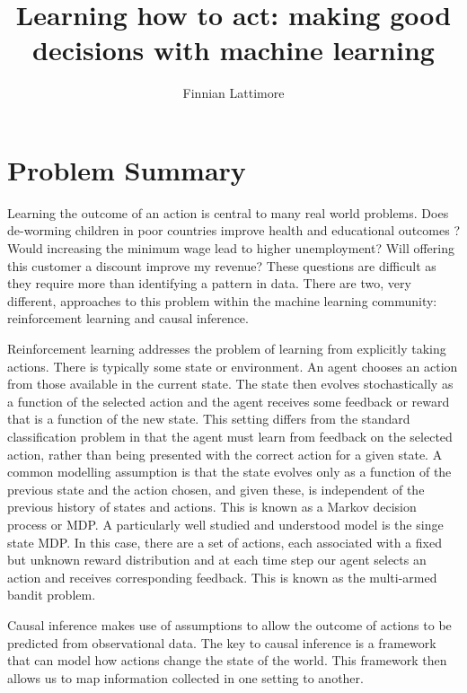 \documentclass[11pt,a4paper]{article}
\author{Finnian Lattimore}
\title{Learning how to act: making good decisions with machine learning}
\begin{document}
\def\ci{\perp\!\!\!\perp} %
\newtheorem{theorem}{Theorem}[section]
\newtheorem{definition}{Definition}[section]
\maketitle

\section{Problem Summary}

Learning the outcome of an action is central to many real world problems. Does de-worming children in poor countries improve health and educational outcomes \cite{miguel2004,davey2015}? Would increasing the minimum wage lead to higher unemployment? Will offering this customer a discount improve my revenue? These questions are difficult as they require more than identifying a pattern in data.  There are two, very different, approaches to this problem within the machine learning community: reinforcement learning and causal inference. 

Reinforcement learning addresses the problem of learning from explicitly taking actions. There is typically some state or environment. An agent chooses an action from those available in the current state. The state then evolves stochastically as a function of the selected action and the agent receives some feedback or reward that is a function of the new state. This setting differs from the standard classification problem in that the agent must learn from feedback on the selected action, rather than being presented with the correct action for a given state. A common modelling assumption is that the state evolves only as a function of the previous state and the action chosen, and given these, is independent of the previous history of states and actions. This is known as a Markov decision process or MDP.  A particularly well studied and understood model is the singe state MDP. In this case, there are a set of actions, each associated with a fixed but unknown reward distribution and at each time step our agent selects an action and receives corresponding feedback. This is known as the multi-armed bandit problem. 

Causal inference makes use of assumptions to allow the outcome of actions to be predicted from observational data. The key to causal inference is a framework that can model how actions change the state of the world. This framework then allows us to map information collected in one setting to another. 
\end{document}
